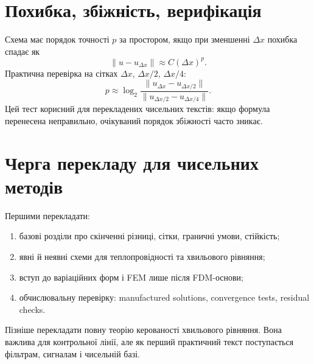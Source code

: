 \section{Похибка, збіжність, верифікація}

Схема має порядок точності $p$ за простором, якщо при зменшенні $\Delta x$ похибка спадає як
\begin{equation}
    \|u-u_{\Delta x}\| \approx C(\Delta x)^p.
\end{equation}
Практична перевірка на сітках $\Delta x$, $\Delta x/2$, $\Delta x/4$:
\begin{equation}
    p\approx \log_2\frac{\|u_{\Delta x}-u_{\Delta x/2}\|}{\|u_{\Delta x/2}-u_{\Delta x/4}\|}.
\end{equation}
Цей тест корисний для перекладених чисельних текстів: якщо формула перенесена неправильно, очікуваний порядок збіжності часто зникає.

\section{Черга перекладу для чисельних методів}

Першими перекладати:
\begin{enumerate}[label=\arabic*.]
  \item базові розділи про скінченні різниці, сітки, граничні умови, стійкість;
  \item явні й неявні схеми для теплопровідності та хвильового рівняння;
  \item вступ до варіаційних форм і FEM лише після FDM-основи;
  \item обчислювальну перевірку: manufactured solutions, convergence tests, residual checks.
\end{enumerate}

Пізніше перекладати повну теорію керованості хвильового рівняння. Вона важлива для контрольної лінії, але як перший практичний текст поступається фільтрам, сигналам і чисельній базі.

